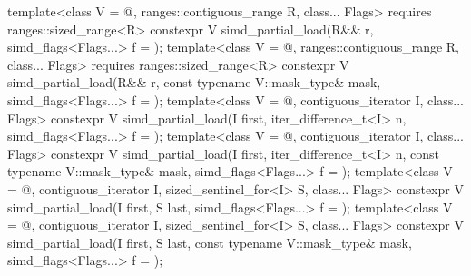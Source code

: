 \begin{itemdecl}
template<class V = @\seebelow@, ranges::contiguous_range R, class... Flags>
  requires ranges::sized_range<R>
  constexpr V simd_partial_load(R&& r, simd_flags<Flags...> f = {});
template<class V = @\seebelow@, ranges::contiguous_range R, class... Flags>
  requires ranges::sized_range<R>
  constexpr V simd_partial_load(R&& r, const typename V::mask_type& mask, simd_flags<Flags...> f = {});
template<class V = @\seebelow@, contiguous_iterator I, class... Flags>
  constexpr V simd_partial_load(I first, iter_difference_t<I> n, simd_flags<Flags...> f = {});
template<class V = @\seebelow@, contiguous_iterator I, class... Flags>
  constexpr V simd_partial_load(I first, iter_difference_t<I> n, const typename V::mask_type& mask,
                        simd_flags<Flags...> f = {});
template<class V = @\seebelow@, contiguous_iterator I, sized_sentinel_for<I> S, class... Flags>
  constexpr V simd_partial_load(I first, S last, simd_flags<Flags...> f = {});
template<class V = @\seebelow@, contiguous_iterator I, sized_sentinel_for<I> S, class... Flags>
  constexpr V simd_partial_load(I first, S last, const typename V::mask_type& mask,
                        simd_flags<Flags...> f = {});
\end{itemdecl}

